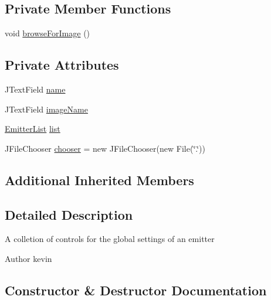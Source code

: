 \subsection*{Private Member Functions}
\begin{DoxyCompactItemize}
\item 
void \mbox{\hyperlink{classorg_1_1newdawn_1_1slick_1_1tools_1_1peditor_1_1_settings_panel_a2cf6675584c386d4feb59b6b39390724}{browse\+For\+Image}} ()
\end{DoxyCompactItemize}
\subsection*{Private Attributes}
\begin{DoxyCompactItemize}
\item 
J\+Text\+Field \mbox{\hyperlink{classorg_1_1newdawn_1_1slick_1_1tools_1_1peditor_1_1_settings_panel_a89dd9ef29714429f196e1009b3a230e9}{name}}
\item 
J\+Text\+Field \mbox{\hyperlink{classorg_1_1newdawn_1_1slick_1_1tools_1_1peditor_1_1_settings_panel_a4890547c09df436528a31f392cec73dd}{image\+Name}}
\item 
\mbox{\hyperlink{classorg_1_1newdawn_1_1slick_1_1tools_1_1peditor_1_1_emitter_list}{Emitter\+List}} \mbox{\hyperlink{classorg_1_1newdawn_1_1slick_1_1tools_1_1peditor_1_1_settings_panel_afb541f799b3425231538a17ca72e8c7c}{list}}
\item 
J\+File\+Chooser \mbox{\hyperlink{classorg_1_1newdawn_1_1slick_1_1tools_1_1peditor_1_1_settings_panel_a33ff97f1c03365d359210ba6c1809726}{chooser}} = new J\+File\+Chooser(new File(\char`\"{}.\char`\"{}))
\end{DoxyCompactItemize}
\subsection*{Additional Inherited Members}


\subsection{Detailed Description}
A colletion of controls for the global settings of an emitter

\begin{DoxyAuthor}{Author}
kevin 
\end{DoxyAuthor}


\subsection{Constructor \& Destructor Documentation}
\mbox{\label{classorg_1_1newdawn_1_1slick_1_1tools_1_1peditor_1_1_settings_panel_a947bd9e9d1a61073529603369b8fda3b}} 

